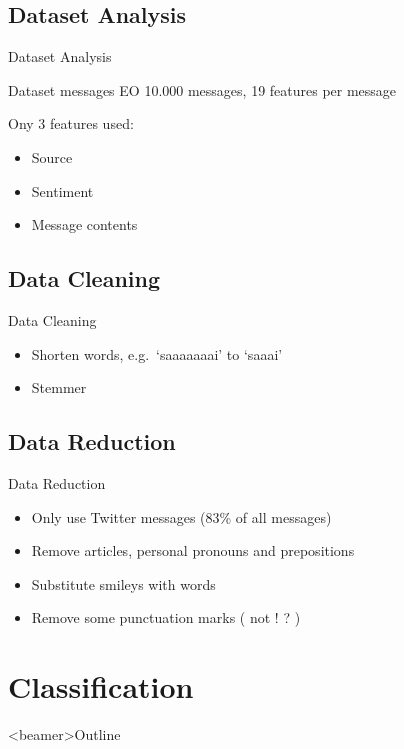 \documentclass{beamer}
\begin{document}
\subsection{Dataset Analysis}
\begin{frame}{Dataset Analysis}
\begin{block}{Dataset messages EO}
10.000 messages, 19 features per message
\end{block}
Ony 3 features used: \\
\begin{itemize}
\item Source
\item Sentiment
\item Message contents
\end{itemize}
\end{frame}


\subsection{Data Cleaning}
\begin{frame}{Data Cleaning}
\begin{itemize}
\item Shorten words, e.g.\ `saaaaaaai' to `saaai'
\item Stemmer
\end{itemize}
\end{frame}

\subsection{Data Reduction}
\begin{frame}{Data Reduction}
\begin{itemize}
\item Only use Twitter messages (83\% of all messages)
\item Remove articles, personal pronouns and prepositions
\item Substitute smileys with words
\item Remove some punctuation marks ( not ! ? )
\end{itemize}
\end{frame}

\section{Classification}
\begin{frame}<beamer>{Outline}
    \setcounter{tocdepth}{2}
    \tableofcontents[
    currentsubsection, 
    hideothersubsections, 
    sectionstyle=show/hide] 
  \end{frame}
\end{document}
